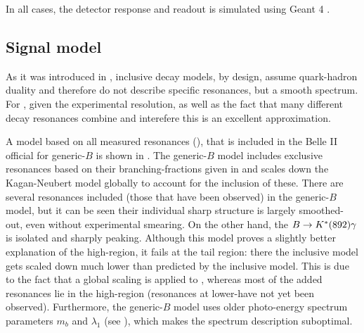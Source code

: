 In all cases, the detector response and readout is simulated using Geant 4 \cite{GEANT4:2002zbu}.

\subsection{Signal model}\label{sec:signal_model}

As it was introduced in , inclusive decay models, by design, assume quark-hadron duality and therefore do not describe specific resonances, but a smooth spectrum.
For \BtoXsgamma, given the experimental resolution, as well as the fact that many different decay resonances combine and interefere this is an excellent approximation.

A model based on all measured resonances (), that is included in the Belle II official \MC for generic-$B$ is shown in .
The generic-$B$ model includes exclusive resonances based on their branching-fractions given in  and scales down the Kagan-Neubert model globally to account for the inclusion of these.
There are several resonances included (those that have been observed) in the generic-$B$ model, but it can be seen their individual sharp structure is largely smoothed-out, even without experimental smearing.
On the other hand, the $B\rightarrow K^*(892)\gamma$ is isolated and sharply peaking.
Although this model proves a slightly better explanation of the high-\EB region, it fails at the tail region: there the inclusive model gets scaled down much lower than predicted by the inclusive model.
This is due to the fact that a global scaling is applied to \BtoXsgamma, whereas most of the added resonances lie in the high-\EB region (resonances at lower-\EB have not yet been observed).
Furthermore, the generic-$B$ model uses older \BtoXsgamma photo-energy spectrum parameters $m_b$ and $\lambda_1$ (see ), which makes the spectrum description suboptimal.

